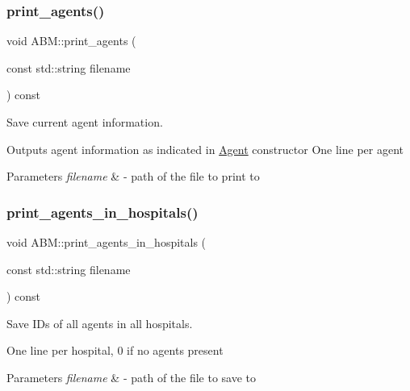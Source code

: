 \subsubsection{\texorpdfstring{print\+\_\+agents()}{print\_agents()}}
{\footnotesize\ttfamily void A\+B\+M\+::print\+\_\+agents (\begin{DoxyParamCaption}\item[{const std\+::string}]{filename }\end{DoxyParamCaption}) const}



Save current agent information. 

Outputs agent information as indicated in \hyperlink{classAgent}{Agent} constructor One line per agent 
\begin{DoxyParams}{Parameters}
{\em filename} & -\/ path of the file to print to \\
\hline
\end{DoxyParams}
\mbox{\label{classABM_adf2f12e0f3d1f134f553869e4e318765}} 
\subsubsection{\texorpdfstring{print\+\_\+agents\+\_\+in\+\_\+hospitals()}{print\_agents\_in\_hospitals()}}
{\footnotesize\ttfamily void A\+B\+M\+::print\+\_\+agents\+\_\+in\+\_\+hospitals (\begin{DoxyParamCaption}\item[{const std\+::string}]{filename }\end{DoxyParamCaption}) const}



Save I\+Ds of all agents in all hospitals. 

One line per hospital, 0 if no agents present 
\begin{DoxyParams}{Parameters}
{\em filename} & -\/ path of the file to save to \\
\hline
\end{DoxyParams}
\mbox{\label{classABM_a8f94332461f1b9494481c1213eb9f3d2}} 
